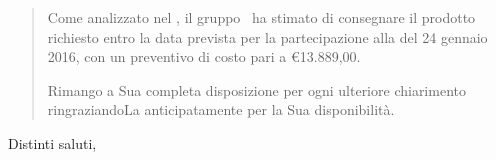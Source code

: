 \documentclass{letter}
\begin{document}
\begin{letter}
\begin{quotation}
\begin{itemize}
	\end{itemize}
	Come analizzato nel \pianodiprogetto, il gruppo \kpanic\ ha stimato di consegnare il prodotto richiesto entro la data prevista per la partecipazione alla \textbf{\revisionedeirequisiti} del 24 gennaio 2016, con un preventivo di costo pari a \euro 13.889,00.

	Rimango a Sua completa disposizione per ogni ulteriore chiarimento ringraziandoLa anticipatamente per la Sua disponibilità.

\end{quotation}

\closing{Distinti saluti,}


\end{letter}
\end{document}
